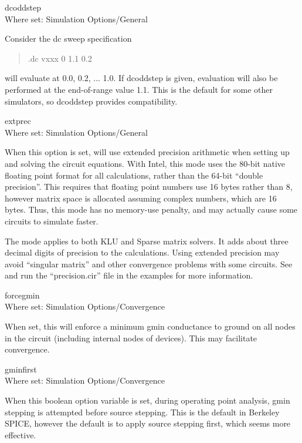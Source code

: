 \begin{description}
\item{\et dcoddstep}\\
Where set: {\cb Simulation Options/General}

Consider the dc sweep specification   
\begin{quote}
\vt .dc vxxx 0 1.1 0.2
\end{quote}
{\WRspice} will evaluate at 0.0, 0.2, ...  1.0.  If {\et dcoddstep} is
given, evaluation will also be performed at the end-of-range value
1.1.  This is the default for some other simulators, so {\et
dcoddstep} provides compatibility.

\item{\et extprec}\\
Where set: {\cb Simulation Options/General}

When this option is set, {\WRspice} will use extended precision
arithmetic when setting up and solving the circuit equations.  With
Intel, this mode uses the 80-bit native floating point format for all
calculations, rather than the 64-bit ``double precision''.  This
requires that floating point numbers use 16 bytes rather than 8,
however matrix space is allocated assuming complex numbers, which are
16 bytes.  Thus, this mode has no memory-use penalty, and may actually
cause some circuits to simulate faster.

The mode applies to both KLU and Sparse matrix solvers.  It adds about
three decimal digits of precision to the calculations.  Using extended
precision may avoid ``singular matrix'' and other convergence problems
with some circuits.  See and run the ``{\vt precision.cir}'' file in
the examples for more information.

\item{\et forcegmin}\\
Where set: {\cb Simulation Options/Convergence}

When set, this will enforce a minimum {\et gmin} conductance to ground
on all nodes in the circuit (including internal nodes of devices). 
This may facilitate convergence.

\item{\et gminfirst}\\
Where set: {\cb Simulation Options/Convergence}

When this boolean option variable is set, during operating point
analysis, gmin stepping is attempted before source stepping.  This is
the default in Berkeley SPICE, however the {\WRspice} default is to
apply source stepping first, which seems more effective.


\end{description}
